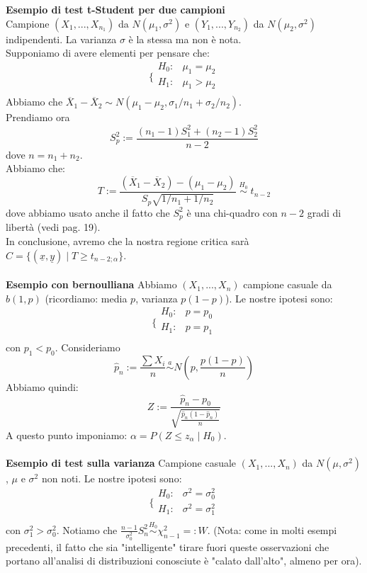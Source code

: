 \textbf{Esempio di test t-Student per due campioni}\\
Campione $(X_1,...,X_{n_1})$ da $N(\mu_1,\sigma^2)$ e $(Y_1,...,Y_{n_2})$ da $N(\mu_2,\sigma^2)$ indipendenti. La varianza $\sigma$ è la stessa ma non è nota.\\
Supponiamo di avere elementi per pensare che:
$$\bigg \{
\begin{array}{rl}
H_0: & \mu_1=\mu_2 \\
H_1: & \mu_1>\mu_2 \\
\end{array}
$$
Abbiamo che $\overline{X}_1 - \overline{X}_2 \sim N(\mu_1 - \mu_2, \sigma_1/n_1 + \sigma_2/n_2)$.\\
Prendiamo ora 
$$S_p^2:= \frac{(n_1-1)S_1^2 + (n_2-1)S_2^2}{n-2}$$ 
dove $n=n_1+n_2$.\\
Abbiamo che:
$$T:= \frac{(\overline{X}_1 - \overline{X}_2)-(\mu_1-\mu_2)}{S_p \sqrt{1/n_1+1/n_2}} \; \stackrel{H_0}{\sim} \; t_{n-2}$$
dove abbiamo usato anche il fatto che $S_p^2$ è una chi-quadro con $n-2$ gradi di libertà (vedi pag. 19).\\
In conclusione, avremo che la nostra regione critica sarà $C=\lbrace (\underline{x},\underline{y}) \mid T \geq t_{n-2;\alpha} \rbrace$.\\
\\
\textbf{Esempio con bernoulliana} Abbiamo $(X_1,...,X_n)$ campione casuale da $b(1,p)$ (ricordiamo: media $p$, varianza $p(1-p)$). Le nostre ipotesi sono:
$$\bigg \{
\begin{array}{rl}
H_0: & p=p_0 \\
H_1: & p=p_1 \\
\end{array}
$$
con $p_1<p_0$. Consideriamo
$$\hat{p}_n := \frac{\sum X_i}{n} \stackrel{a}{\sim} N \left( p, \frac{p(1-p)}{n} \right)$$
Abbiamo quindi:
$$Z:= \frac{\hat{p}_n-p_0}{\sqrt{\frac{\hat{p}_n (1-\hat{p}_n)}{n}}}$$
A questo punto imponiamo: $\alpha = P(Z \leq z_{\alpha} \mid H_0)$.\\
\\
\textbf{Esempio di test sulla varianza} Campione casuale $(X_1,...,X_n)$ da $N(\mu,\sigma^2)$, $\mu$ e $\sigma^2$ non noti. Le nostre ipotesi sono: 
$$\bigg \{
\begin{array}{rl}
H_0: & \sigma^2=\sigma_0^2 \\
H_1: & \sigma^2=\sigma_1^2 \\
\end{array}
$$
con $\sigma_1^2 > \sigma_0^2$.
Notiamo che $\frac{n-1}{\sigma_0^2} S_n^2 \stackrel{H_0}{\sim} \chi_{n-1}^2 =: W$. (Nota: come in molti esempi precedenti, il fatto che sia "intelligente" tirare fuori queste osservazioni che portano all'analisi di distribuzioni conosciute è "calato dall'alto", almeno per ora).\\
